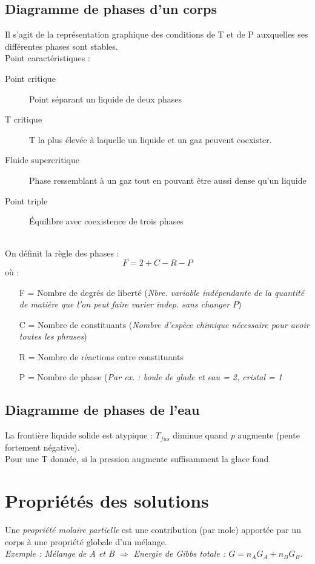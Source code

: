 \documentclass	[11pt, a4paper, openany]{book}
\begin{document}
\subsection{Diagramme de phases d'un corps}
Il s'agit de la représentation graphique des conditions de T et de P auxquelles ses différentes phases sont stables.\\
Point caractéristiques :
\begin{description}
	\item[Point critique] Point séparant un liquide de deux phases
	\item[T critique] T la plus élevée à laquelle un liquide et un gaz peuvent coexister.
	\item[Fluide supercritique] Phase ressemblant à un gaz tout en pouvant être aussi dense qu'un liquide
	\item[Point triple] Équilibre avec coexistence de trois phases
\end{description}
\ \\
On définit la règle des phases :
$$F = 2 + C - R - P$$
où :
\begin{itemize}
	\item[F] = Nombre de degrés de liberté (\textit{Nbre. variable indépendante de la quantité de matière que l'on peut faire varier indep. sans changer $P$})
	\item[C] = Nombre de constituants (\textit{Nombre d'espèce chimique nécessaire pour avoir toutes les phrases})
	\item[R] = Nombre de réactions entre constituants
	\item[P] = Nombre de phase (\textit{Par ex. : boule de glade et eau = 2, cristal = 1}
\end{itemize}
\subsection{Diagramme de phases de l'eau}
La frontière liquide solide est atypique : $T_{fus}$ diminue quand $p$ augmente (pente fortement négative).\\
Pour une T donnée, si la pression augmente suffisamment la glace fond.

\section{Propriétés des solutions}
Une \textit{propriété molaire partielle} est une contribution (par mole) apportée par un corps à une propriété  globale d'un mélange.\\
\textit{Exemple : Mélange de A et B $\Rightarrow$ Energie de Gibbs totale : $G = n_A G_A + n_B G_B$}.\\
\end{document}
